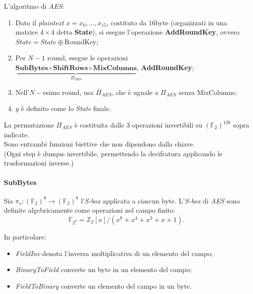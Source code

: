 \noindent L'algoritmo di \textit{AES}:
\begin{enumerate}
    \item Dato il \textit{plaintext} $x=x_0, \dots, x_{15}$, costituto da $16$byte (organizzati in una matrice $4 \times 4$ detta \textbf{State}), si esegue l'operazione \textbf{AddRoundKey}, ovvero $\textit{State}=\textit{State} \oplus \text{RoundKey}$;
    \item Per $N-1$ round, esegue le operazioni $\underbrace{\textbf{SubBytes} \circ \textbf{ShiftRows} \circ \textbf{MixColumns}}_{\Pi_{\text{AES}}}$, \textbf{AddRoundKey};
    \item Nell'$N-$esimo round, usa $\bar{\Pi}_{AES}$, che è uguale a $\Pi_{AES}$ senza MixColumns;
    \item $y$ è definito come lo \textit{State} finale.
\end{enumerate}

\vspace{0.2cm} \noindent La permutazione $\Pi_{AES}$ è costituita dalle 3 operazioni invertibili su $(\mathbb{F}_2)^{128}$ sopra indicate. \\ Sono entrambi funzioni biettive che non dipendono dalla chiave. \\(Ogni step è dunque invertibile, permettendo la decifratura applicando le trasformazioni inverse.)

\paragraph{SubBytes} Sia $\pi_s: (\mathbb{F}_2)^8 \to (\mathbb{F}_2) ^8$ l'\textit{S-box} applicata a ciascun byte. 
L'\textit{S-box} di \textit{AES} sono definite algebricamente come operazioni nel campo finito:
\[
\mathbb{F}_{2^8}=\mathbb{Z}_2[x]/(x^8+x^4+x^3+x+1). 
\]

\noindent In particolare:
\begin{itemize}
    \item \emph{FieldInv} denota l'inversa moltiplicativa di un elemento del campo;
    \item \emph{BinaryToField} converte un byte in un elemento del campo;
    \item \emph{FieldToBinary} converte un elemento del campo in un byte.
\end{itemize}

